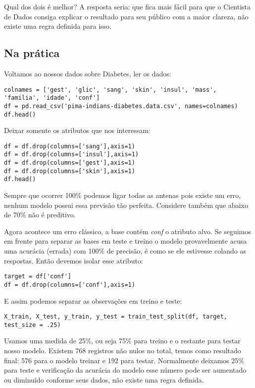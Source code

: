 Qual dos dois é melhor? A resposta seria: que fica mais fácil para que o Cientista de Dados consiga explicar o resultado para seu público com a maior clareza, não existe uma regra definida para isso. 

\subsection{Na prática}
Voltamos ao nossos dados sobre Diabetes, ler os dados:
\begin{lstlisting}[]
colnames = ['gest', 'glic', 'sang', 'skin', 'insul', 'mass', 'familia', 'idade', 'conf']
df = pd.read_csv('pima-indians-diabetes.data.csv', names=colnames)
df.head()
\end{lstlisting}

Deixar somente os atributos que nos interessam:
\begin{lstlisting}[]
df = df.drop(columns=['sang'],axis=1)
df = df.drop(columns=['insul'],axis=1)
df = df.drop(columns=['gest'],axis=1)
df = df.drop(columns=['skin'],axis=1)
df.head()
\end{lstlisting}

\begin{note}[100\% de Precisão] 
	Sempre que ocorrer 100\% podemos ligar todas as antenas pois existe um erro, nenhum modelo possui essa previsão tão perfeita. Considere também que abaixo de 70\% não é preditivo.
\end{note}

Agora acontece um erro clássico, a base contém \textit{conf} o atributo alvo. Se seguimos em frente para separar as bases em teste e treino o modelo provavelmente acusa uma acurácia (errada) com 100\% de precisão, é como se ele estivesse colando as respostas. Então devemos isolar esse atributo: 
\begin{lstlisting}[]
target = df['conf']
df = df.drop(columns=['conf'],axis=1)
\end{lstlisting}

E assim podemos separar as observações em treino e teste:
\begin{lstlisting}[]
X_train, X_test, y_train, y_test = train_test_split(df, target, test_size = .25)
\end{lstlisting}

Usamos uma medida de 25\%, ou seja 75\% para treino e o restante para testar nosso modelo. Existem 768 registros não nulos no total, temos como resultado final: 576 para o modelo treinar e 192 para testar. Normalmente deixamos 25\% para teste e verificação da acurácia do modelo esse número pode ser aumentado ou diminuído conforme seus dados, não existe uma regra definida.


